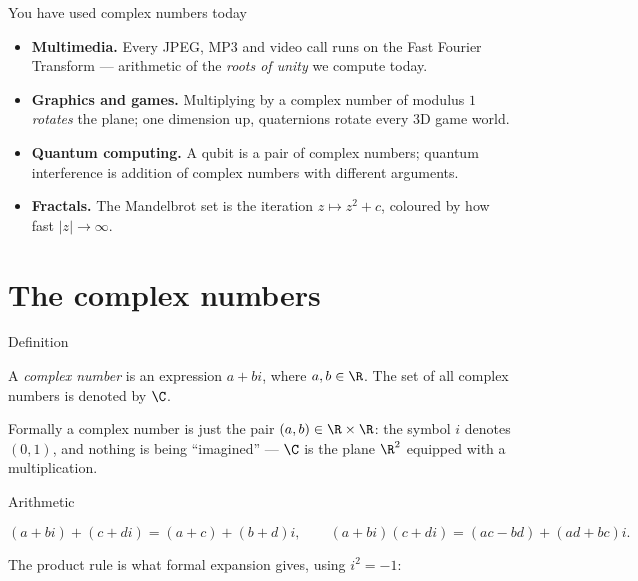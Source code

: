 \begin{frame}{You have used complex numbers today}
\begin{itemize}
\item \textbf{Multimedia.} Every JPEG, MP3 and video call runs on the Fast Fourier
Transform — arithmetic of the \emph{roots of unity} we compute today.
\pause
\item \textbf{Graphics and games.} Multiplying by a complex number of modulus $1$
\emph{rotates} the plane; one dimension up, quaternions rotate every 3D game world.
\pause
\item \textbf{Quantum computing.} A qubit is a pair of complex numbers; quantum
interference is addition of complex numbers with different arguments.
\pause
\item \textbf{Fractals.} The Mandelbrot set is the iteration $z \mapsto z^2 + c$,
coloured by how fast $|z| \to \infty$.
\end{itemize}
\end{frame}

\section{The complex numbers}

\begin{frame}{Definition}
\begin{definition}
A \emph{complex number} is an expression $a + bi$, where $a, b \in \R$.
The set of all complex numbers is denoted by $\C$.
\end{definition}

\pause

\begin{remark}
Formally a complex number is just the pair $(a,b) \in \R \times \R$: the symbol $i$
denotes $(0,1)$, and nothing is being ``imagined'' — $\C$ is the plane $\R^2$
equipped with a multiplication.
\end{remark}
\end{frame}

\begin{frame}{Arithmetic}
\begin{definition}
\[
(a+bi) + (c+di) = (a+c) + (b+d)i, \qquad
(a+bi)(c+di) = (ac - bd) + (ad + bc)i.
\]
\end{definition}

The product rule is what formal expansion gives, using $i^2 = -1$:

\pause

\begin{steps}
\end{steps}
\end{frame}


